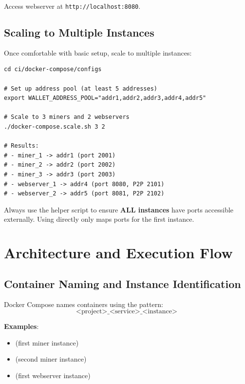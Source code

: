 Access webserver at \texttt{http://localhost:8080}.

\subsection{Scaling to Multiple Instances}

Once comfortable with basic setup, scale to multiple instances:

\begin{listing}[htbp]
\caption{Scale to Multiple Miners and Webservers}
\label{lst:ch22-scale}
\begin{verbatim}
cd ci/docker-compose/configs

# Set up address pool (at least 5 addresses)
export WALLET_ADDRESS_POOL="addr1,addr2,addr3,addr4,addr5"

# Scale to 3 miners and 2 webservers
./docker-compose.scale.sh 3 2

# Results:
# - miner_1 -> addr1 (port 2001)
# - miner_2 -> addr2 (port 2002)
# - miner_3 -> addr3 (port 2003)
# - webserver_1 -> addr4 (port 8080, P2P 2101)
# - webserver_2 -> addr5 (port 8081, P2P 2102)
\end{verbatim}
\end{listing}

\begin{notebox}
Always use the helper script  to ensure \textbf{ALL instances} have ports accessible externally. Using  directly only maps ports for the first instance.
\end{notebox}

\section{Architecture and Execution Flow}
\label{sec:docker-architecture}

\subsection{Container Naming and Instance Identification}

Docker Compose names containers using the pattern:
\begin{equation}
\text{<project>\_<service>\_<instance>}
\end{equation}

\textbf{Examples}:
\begin{itemize}
  \item {} (first miner instance)
  \item {} (second miner instance)
  \item {} (first webserver instance)
\end{itemize}

